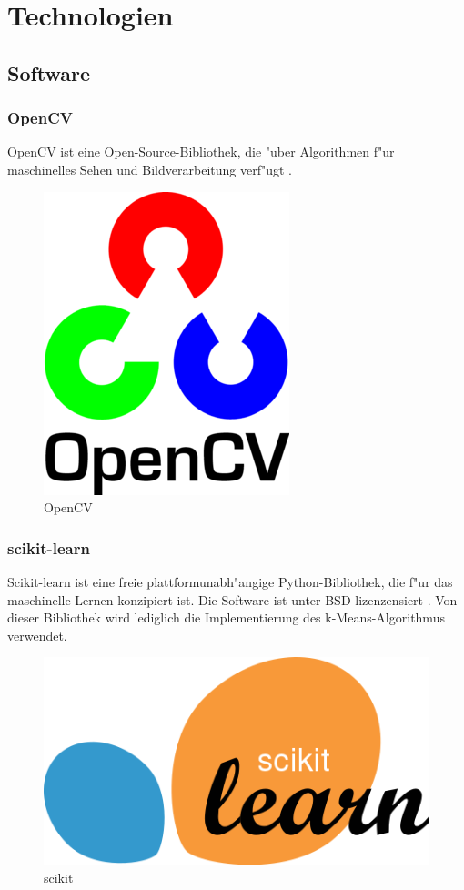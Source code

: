 \chapter{Technologien}
\label{cha:technologien}

\section{Software}
\label{sec:software}

\subsection{OpenCV}
\label{sec:opencv}

OpenCV ist eine Open-Source-Bibliothek, die "uber Algorithmen f"ur maschinelles Sehen und Bildverarbeitung verf"ugt \cite{Ocv}.

\begin{figure}[H]
	\includegraphics[scale=1.0]{bilder/opencv}
	\caption[OpenCV]{OpenCV}
\end{figure}

\subsection{scikit-learn}
\label{sec:scikitlearn}

Scikit-learn ist eine freie plattformunabh"angige Python-Bibliothek, die f"ur das maschinelle Lernen konzipiert ist. Die Software ist unter BSD lizenzensiert \cite{ScL}.
Von dieser Bibliothek wird lediglich die Implementierung des k-Means-Algorithmus verwendet.

\begin{figure}[H]
	\includegraphics[scale=0.2]{bilder/scikit}
	\caption[scikit]{scikit}
\end{figure}


